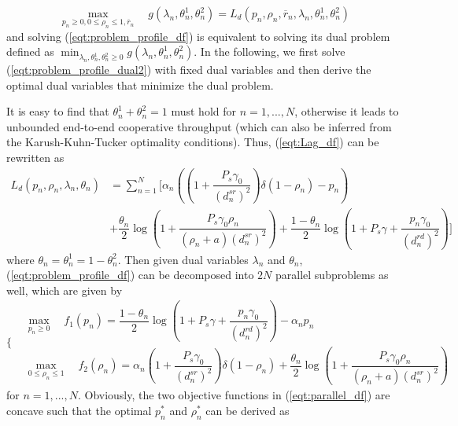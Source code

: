\documentclass[12pt, draftclsnofoot, onecolumn]{IEEEtran}
\begin{document}
\begin{equation}\label{eqt:problem_profile_dual2}
\max\limits_{p_{n}\geq 0,0\leq\rho_{n}\leq 1,\overline{r}_{n}}\quad g(\lambda_{n},\theta^{1}_{n},\theta^{2}_{n})=L_{d}(p_{n},\rho_{n},\overline{r}_{n},\lambda_{n},\theta^{1}_{n},\theta^{2}_{n})
\end{equation}
and solving (\ref{eqt:problem_profile_df}) is equivalent to solving its dual problem defined as $\min _{\lambda_{n},\theta^{1}_{n},\theta^{2}_{n}\geq 0}g(\lambda _{n},\theta^{1}_{n},\theta^{2}_{n})$. In the following, we first solve (\ref{eqt:problem_profile_dual2}) with fixed dual variables and then derive the optimal dual variables that minimize the dual problem.

It is easy to find that $\theta^{1}_{n}+\theta^{2}_{n}=1$ must hold for $n=1,...,N$, otherwise it leads to unbounded end-to-end cooperative throughput (which can also be inferred from the Karush-Kuhn-Tucker optimality conditions). Thus, (\ref{eqt:Lag_df}) can be rewritten as
\begin{equation}\label{eqt:Lag_df2}
\begin{aligned}
L_{d}(p_{n},\rho_{n},\lambda_{n},\theta_{n})&=\sum\limits_{n=1}^{N}[\alpha_{n}((1+\dfrac{P_{s}\gamma_{0}}{(d^{sr}_{n})^{2}})\delta(1-\rho_{n})-p_{n})\\
&+\dfrac{\theta_{n}}{2}\log (1+\dfrac{P_{s}\gamma_{0}\rho_{n}}{(\rho_{n}+a)(d^{sr}_{n})^{2}})+\dfrac{1-\theta_{n}}{2}\log (1+P_{s}\gamma+\dfrac{p_{n}\gamma_{0}}{(d^{rd}_{n})^{2}})]
\end{aligned}
\end{equation}
where $\theta_{n}=\theta^{1}_{n}=1-\theta^{2}_{n}$. Then given dual variables $\lambda_{n}$ and $\theta_{n}$, (\ref{eqt:problem_profile_df}) can be decomposed into $2N$ parallel subproblems as well, which are given by
\begin{equation}\label{eqt:parallel_df}
\left.\{
\begin{aligned}
&\max\limits_{p_{n}\geq 0}\quad f_{1}(p_{n})=\dfrac{1-\theta_{n}}{2}\log (1+P_{s}\gamma+\dfrac{p_{n}\gamma_{0}}{(d^{rd}_{n})^{2}})-\alpha_{n}p_{n}\\
&\max\limits_{0\leq\rho_{n}\leq 1}\quad f_{2}(\rho_{n})=\alpha_{n}(1+\dfrac{P_{s}\gamma_{0}}{(d^{sr}_{n})^{2}})\delta(1-\rho_{n})+\dfrac{\theta_{n}}{2}\log (1+\dfrac{P_{s}\gamma_{0}\rho_{n}}{(\rho_{n}+a)(d^{sr}_{n})^{2}})
\end{aligned}
\right.
\end{equation}
for $n=1,...,N$. Obviously, the two objective functions in (\ref{eqt:parallel_df}) are concave such that the optimal $p^{*}_{n}$ and $\rho^{*}_{n}$ can be derived as 
\end{document}
